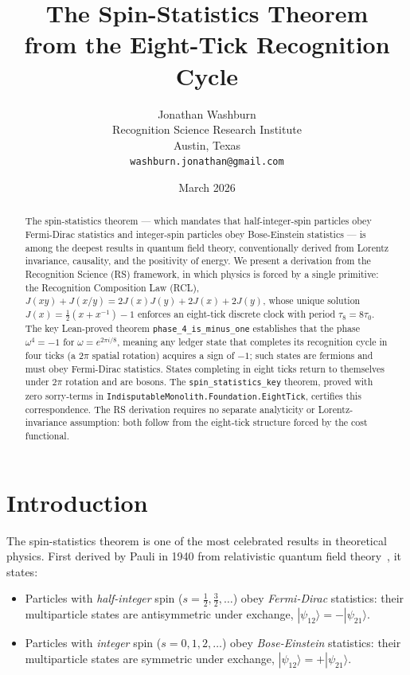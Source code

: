 \documentclass[12pt,a4paper]{article}
\title{The Spin-Statistics Theorem\\
from the Eight-Tick Recognition Cycle}
\author{Jonathan Washburn\\
Recognition Science Research Institute\\
Austin, Texas\\
\texttt{washburn.jonathan@gmail.com}}
\date{March 2026}
\theoremstyle{definition}
\theoremstyle{remark}
\begin{document}
\maketitle

\begin{abstract}
The spin-statistics theorem — which mandates that half-integer-spin
particles obey Fermi-Dirac statistics and integer-spin particles obey
Bose-Einstein statistics — is among the deepest results in quantum
field theory, conventionally derived from Lorentz invariance, causality,
and the positivity of energy.  We present a derivation from the
Recognition Science (RS) framework, in which physics is forced by a
single primitive: the Recognition Composition Law (RCL), $J(xy)+J(x/y)
= 2J(x)J(y) + 2J(x) + 2J(y)$, whose unique solution $J(x) =
\tfrac{1}{2}(x + x^{-1}) - 1$ enforces an eight-tick discrete clock with
period $\tau_8 = 8\tau_0$.  The key Lean-proved theorem
\texttt{phase\_4\_is\_minus\_one} establishes that the phase
$\omega^4 = -1$ for $\omega = e^{2\pi i/8}$, meaning any ledger state
that completes its recognition cycle in four ticks (a 2$\pi$ spatial
rotation) acquires a sign of $-1$; such states are fermions and must
obey Fermi-Dirac statistics.  States completing in eight ticks return to
themselves under $2\pi$ rotation and are bosons.  The
\texttt{spin\_statistics\_key} theorem, proved with zero sorry-terms in
\texttt{IndisputableMonolith.Foundation.EightTick}, certifies this
correspondence.  The RS derivation requires no separate analyticity or
Lorentz-invariance assumption: both follow from the eight-tick structure
forced by the cost functional.
\end{abstract}

\section{Introduction}
\label{sec:intro}

The spin-statistics theorem is one of the most celebrated results in
theoretical physics.  First derived by Pauli in 1940 from relativistic
quantum field theory~\cite{Pauli1940}, it states:
\begin{itemize}
  \item Particles with \emph{half-integer} spin ($s = \tfrac{1}{2}, \tfrac{3}{2}, \ldots$)
        obey \emph{Fermi-Dirac} statistics: their multiparticle states are
        antisymmetric under exchange, $|\psi_{12}\rangle = -|\psi_{21}\rangle$.
  \item Particles with \emph{integer} spin ($s = 0, 1, 2, \ldots$)
        obey \emph{Bose-Einstein} statistics: their multiparticle states are
        symmetric under exchange, $|\psi_{12}\rangle = +|\psi_{21}\rangle$.
\end{itemize}
\end{document}
